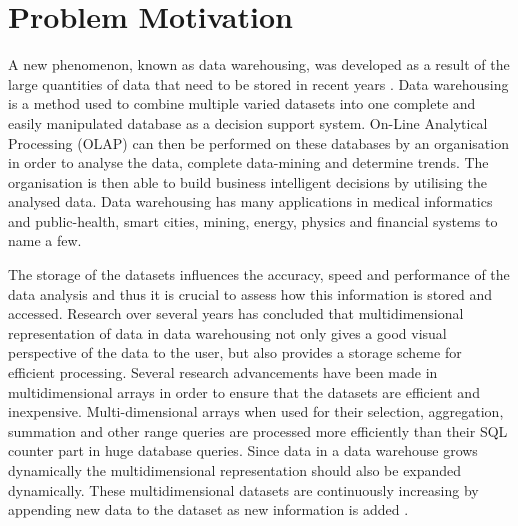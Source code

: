 \section{Problem Motivation}
A new phenomenon, known as data warehousing, was developed as a result of the large quantities of data that need to be stored in recent years \cite{golfarelli:2009:dwd}. Data warehousing is a method used to combine multiple varied datasets into one complete and easily manipulated database as a decision support system. On-Line Analytical Processing (OLAP) can then be performed on these databases by an organisation in order to analyse the data, complete data-mining and determine trends. The organisation is then able to build business intelligent decisions by utilising the analysed data. Data warehousing has many applications in medical informatics and public-health, smart cities, mining, energy, physics and financial systems to name a few.

The storage of the datasets influences the accuracy, speed and performance of the data analysis and thus it is crucial to assess how this information is stored and accessed. Research over several years has concluded that multidimensional representation of data in data warehousing not only gives a good visual perspective of the data to the user, but also provides a storage scheme for efficient processing. Several research advancements have been made in multidimensional arrays in order to ensure that the datasets are efficient and inexpensive. Multi-dimensional arrays when used for their selection, aggregation, summation and other range queries are processed more efficiently than their SQL counter part in huge database queries. Since data in a data warehouse grows dynamically the multidimensional representation should also be expanded dynamically. These multidimensional datasets are continuously increasing by appending new data to the dataset as new information is added \cite{otoo:2006:esa}.

